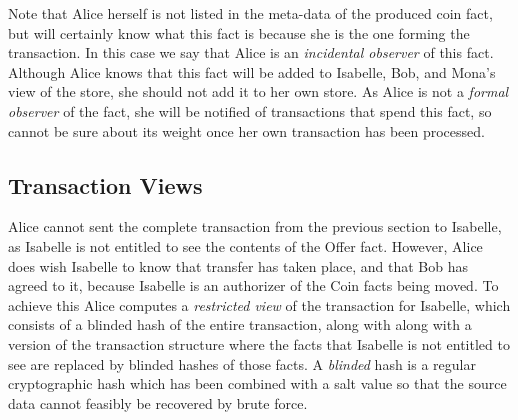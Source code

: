 Note that Alice herself is not listed in the meta-data of the produced coin fact, but will certainly know what this fact is because she is the one forming the transaction. In this case we say that Alice is an \emph{incidental observer} of this fact. Although Alice knows that this fact will be added to Isabelle, Bob, and Mona's view of the store, she should not add it to her own store. As Alice is not a \emph{formal observer} of the fact, she will be notified of transactions that spend this fact, so cannot be sure about its weight once her own transaction has been processed.



\subsection{Transaction Views}
Alice cannot sent the complete transaction from the previous section to Isabelle, as Isabelle is not entitled to see the contents of the Offer fact. However, Alice does wish Isabelle to know that transfer has taken place, and that Bob has agreed to it, because Isabelle is an authorizer of the Coin facts being moved. To achieve this Alice computes a \emph{restricted view} of the transaction for Isabelle, which consists of a blinded hash of the entire transaction, along with along with a version of the transaction structure where the facts that Isabelle is not entitled to see are replaced by blinded hashes of those facts. A \emph{blinded} hash is a regular cryptographic hash which has been combined with a salt value so that the source data cannot feasibly be recovered by brute force.

